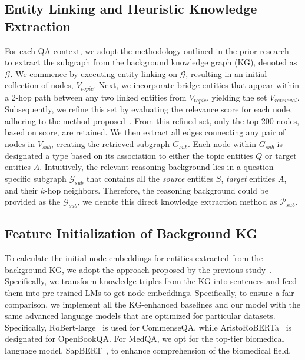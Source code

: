 \documentclass{article}
\theoremstyle{boldremark}
\begin{document}
\subsection{Entity Linking and Heuristic Knowledge Extraction}\label{app:entity_link}
For each QA context, we adopt the methodology outlined in the prior research~\cite{KagNet,yasunaga2022deep} to extract the subgraph from the background knowledge graph (KG), denoted as $\mathcal{G}$. We commence by executing entity linking on $\mathcal{G}$, resulting in an initial collection of nodes, $V_{topic}$. Next, we incorporate bridge entities that appear within a 2-hop path between any two linked entities from $V_{topic}$, yielding the set $V_{retrieval}$. Subsequently, we refine this set by evaluating the relevance score for each node, adhering to the method proposed~\cite{yasunaga2022deep}. From this refined set, only the top 200 nodes, based on score, are retained. We then extract all edges connecting any pair of nodes in $V_{sub}$, creating the retrieved subgraph $G_{sub}$. Each node within $G_{sub}$ is designated a type based on its association to either the topic entities $Q$ or target entities $A$. Intuitively, the relevant reasoning background lies in a question-specific subgraph $\mathcal{G}_{sub}$ that contains all the \textit{source} entities $S$, \textit{target} entities $A$, and their $k$-hop neighbors. Therefore, the reasoning background could be provided as the $\mathcal{G}_{sub}$, we denote this direct knowledge extraction method as $\mathcal{P}_{sub}$.
\subsection{Feature  Initialization of Background KG}
To calculate the initial node embeddings for entities extracted from the background KG, we adopt the approach proposed by the previous study~\cite{MHGRN}. Specifically, we transform knowledge triples from the KG into sentences and feed them into pre-trained LMs to get node embeddings. Specifically, to ensure a fair comparison, we implement all the KG-enhanced baselines and our model with the same advanced language models that are optimized for particular datasets. 
Specifically, RoBert-large~\cite{liu2019roberta} is used for CommenseQA, while AristoRoBERTa~\cite{clark2020f} is designated for OpenBookQA. For MedQA, we opt for the top-tier  biomedical language model, SapBERT~\cite{liu2020self}, to enhance comprehension of the biomedical field.
\end{document}
